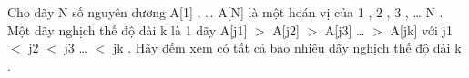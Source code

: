Cho dãy N số nguyên dương A[1] , … A[N] là một hoán vị của 1 , 2 , 3 , … N .   
\\   Một dãy nghịch thế độ dài k là 1 dãy A[j1] $>$ A[j2] $>$ A[j3] … $>$ A[jk] với j1 $<$ j2 $<$ j3 … $<$ jk . Hãy đếm xem có tất cả bao nhiêu dãy nghịch thế độ dài k .